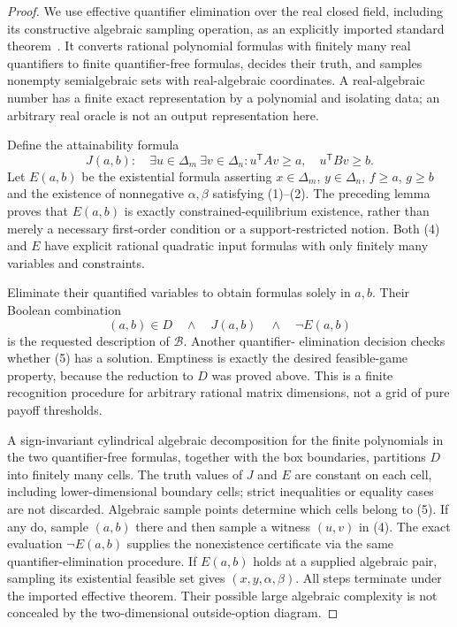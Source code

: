 \documentclass[11pt]{article}
\theoremstyle{definition}
\theoremstyle{remark}
\begin{document}
\begin{proof}
We use effective quantifier elimination over the real closed field,
including its constructive algebraic sampling operation, as an explicitly
imported standard theorem~\cite{BPR}. It converts rational polynomial
formulas with finitely many real quantifiers to finite quantifier-free
formulas, decides their truth, and samples nonempty semialgebraic sets
with real-algebraic coordinates. A real-algebraic number has a finite exact
representation by a polynomial and isolating data; an arbitrary real
oracle is not an output representation here.

Define the attainability formula
\[
 J(a,b):\quad\exists u\in\Delta_m\ \exists v\in\Delta_n:
      u^{\mathsf T}Av\geq a,\quad u^{\mathsf T}Bv\geq b. \tag{4}
\]
Let $E(a,b)$ be the existential formula asserting
$x\in\Delta_m$, $y\in\Delta_n$, $f\geq a$, $g\geq b$ and the existence
of nonnegative $\alpha,\beta$ satisfying (1)--(2). The preceding lemma
proves that $E(a,b)$ is exactly constrained-equilibrium existence, rather
than merely a necessary first-order condition or a support-restricted
notion. Both (4) and $E$ have explicit rational quadratic input formulas
with only finitely many variables and constraints.

Eliminate their quantified variables to obtain formulas solely in $a,b$.
Their Boolean combination
\[
 (a,b)\in D\quad\wedge\quad J(a,b)\quad\wedge\quad\neg E(a,b)
                                                               \tag{5}
\]
is the requested description of $\mathcal B$. Another quantifier-
elimination decision checks whether (5) has a solution. Emptiness is
exactly the desired feasible-game property, because the reduction to $D$
was proved above. This is a finite recognition procedure for arbitrary
rational matrix dimensions, not a grid of pure payoff thresholds.

A sign-invariant cylindrical algebraic decomposition for the finite
polynomials in the two quantifier-free formulas, together with the box
boundaries, partitions $D$ into finitely many cells. The truth values of
$J$ and $E$ are constant on each cell, including lower-dimensional boundary
cells; strict inequalities or equality cases are not discarded. Algebraic
sample points determine which cells belong to (5). If any do, sample
$(a,b)$ there and then sample a witness $(u,v)$ in (4). The exact evaluation
$\neg E(a,b)$ supplies the nonexistence certificate via the same
quantifier-elimination procedure. If $E(a,b)$ holds at a supplied algebraic
pair, sampling its existential feasible set gives $(x,y,\alpha,\beta)$.
All steps terminate under the imported effective theorem. Their possible
large algebraic complexity is not concealed by the two-dimensional
outside-option diagram.
\end{proof}
\end{document}
